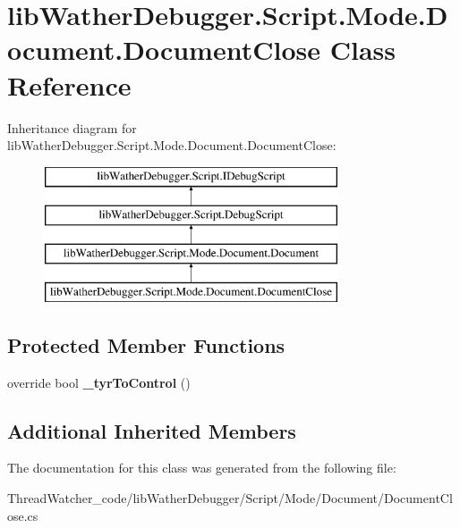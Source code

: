 \hypertarget{classlib_wather_debugger_1_1_script_1_1_mode_1_1_document_1_1_document_close}{\section{lib\+Wather\+Debugger.\+Script.\+Mode.\+Document.\+Document\+Close Class Reference}
\label{classlib_wather_debugger_1_1_script_1_1_mode_1_1_document_1_1_document_close}
}
Inheritance diagram for lib\+Wather\+Debugger.\+Script.\+Mode.\+Document.\+Document\+Close\+:\begin{figure}[H]
\begin{center}
\leavevmode
\includegraphics[height=4.000000cm]{classlib_wather_debugger_1_1_script_1_1_mode_1_1_document_1_1_document_close}
\end{center}
\end{figure}
\subsection*{Protected Member Functions}
\begin{DoxyCompactItemize}
\item 
\hypertarget{classlib_wather_debugger_1_1_script_1_1_mode_1_1_document_1_1_document_close_a164a59f354c2c603d2b1a1bf3cd0b5a2}{override bool {\bfseries \+\_\+tyr\+To\+Control} ()}\label{classlib_wather_debugger_1_1_script_1_1_mode_1_1_document_1_1_document_close_a164a59f354c2c603d2b1a1bf3cd0b5a2}

\end{DoxyCompactItemize}
\subsection*{Additional Inherited Members}


The documentation for this class was generated from the following file\+:\begin{DoxyCompactItemize}
\item 
Thread\+Watcher\+\_\+code/lib\+Wather\+Debugger/\+Script/\+Mode/\+Document/Document\+Close.\+cs\end{DoxyCompactItemize}
